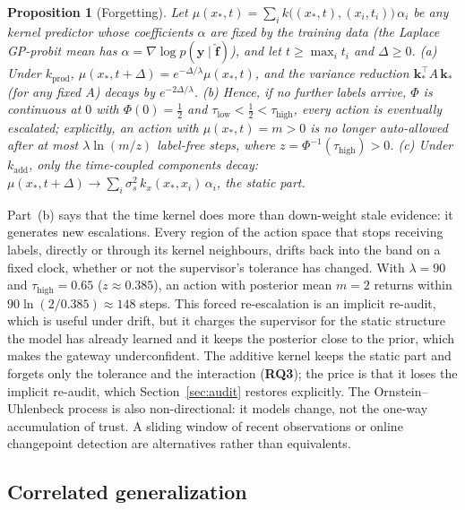 \documentclass[11pt]{article}
\newtheorem{proposition}{Proposition}
\newcommand{\RQ}[1]{\textbf{RQ#1}}
\begin{document}
\begin{proposition}[Forgetting]\label{prop:forget}
Let $\mu(x_*, t) = \sum_i k\bigl((x_*,t),(x_i,t_i)\bigr)\,\alpha_i$ be any
kernel predictor whose coefficients $\alpha$ are fixed by the training data
(the Laplace GP-probit mean has $\alpha = \nabla\log p(\mathbf y\mid\hat{\mathbf f})$),
and let $t \ge \max_i t_i$ and $\Delta \ge 0$.
(a) Under $k_{\text{prod}}$, $\mu(x_*, t+\Delta) = e^{-\Delta/\lambda}\mu(x_*, t)$,
and the variance reduction $\mathbf k_*^\top A\,\mathbf k_*$ (for any fixed $A$)
decays by $e^{-2\Delta/\lambda}$.
(b) Hence, if no further labels arrive, $\Phi$ is continuous at $0$ with
$\Phi(0)=\tfrac12$ and $\tau_{\text{low}} < \tfrac12 < \tau_{\text{high}}$,
every action is eventually escalated; explicitly, an action with
$\mu(x_*,t) = m > 0$ is no longer auto-allowed after at most
$\lambda \ln(m/z)$ label-free steps, where
$z = \Phi^{-1}(\tau_{\text{high}}) > 0$.
(c) Under $k_{\text{add}}$, only the time-coupled components decay:
$\mu(x_*, t+\Delta) \to \sum_i \sigma_s^2\, k_x(x_*, x_i)\,\alpha_i$, the
static part.
\end{proposition}

Part~(b) says that the time kernel does more than down-weight stale evidence:
it generates new escalations. Every region of the action space that stops
receiving labels, directly or through its kernel neighbours, drifts back into
the band on a fixed clock, whether or not the supervisor's tolerance has
changed. With $\lambda = 90$ and $\tau_{\text{high}} = 0.65$
($z \approx 0.385$), an action with posterior mean $m = 2$ returns within
$90 \ln(2/0.385) \approx 148$ steps. This forced re-escalation is an implicit
re-audit, which is useful under drift, but it charges the supervisor for the
static structure the model has already learned and it keeps the posterior
close to the prior, which makes the gateway underconfident. The additive
kernel keeps the static part and forgets only the tolerance and the
interaction (\RQ3); the price is that it loses the implicit re-audit, which
Section~\ref{sec:audit} restores explicitly. The Ornstein--Uhlenbeck process
is also non-directional: it models change, not the one-way accumulation of
trust. A sliding window of recent observations or online changepoint
detection \citep{adams2007bocd} are alternatives rather than equivalents.

\subsection{Correlated generalization}\label{sec:correlated}
\end{document}

